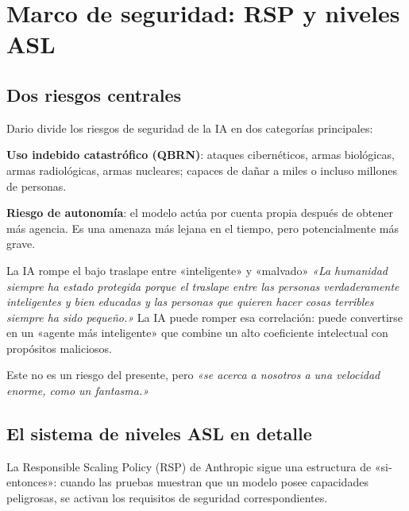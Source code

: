 \section{Marco de seguridad: RSP y niveles ASL}

\subsection{Dos riesgos centrales}

Dario divide los riesgos de seguridad de la IA en dos categorías principales:

\textbf{Uso indebido catastrófico (QBRN)}: ataques cibernéticos, armas biológicas, armas radiológicas, armas nucleares; capaces de dañar a miles o incluso millones de personas.

\textbf{Riesgo de autonomía}: el modelo actúa por cuenta propia después de obtener más agencia. Es una amenaza más lejana en el tiempo, pero potencialmente más grave.

\begin{warningbox}{La IA rompe el bajo traslape entre «inteligente» y «malvado»}
\textit{«La humanidad siempre ha estado protegida porque el traslape entre las personas verdaderamente inteligentes y bien educadas y las personas que quieren hacer cosas terribles siempre ha sido pequeño.»} La IA puede romper esa correlación: puede convertirse en un «agente más inteligente» que combine un alto coeficiente intelectual con propósitos maliciosos.

Este no es un riesgo del presente, pero \textit{«se acerca a nosotros a una velocidad enorme, como un fantasma.»}
\end{warningbox}

\subsection{El sistema de niveles ASL en detalle}

La Responsible Scaling Policy (RSP) de Anthropic sigue una estructura de «si-entonces»: cuando las pruebas muestran que un modelo posee capacidades peligrosas, se activan los requisitos de seguridad correspondientes.

